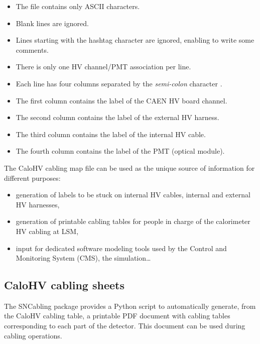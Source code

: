 \begin{itemize}
\item The file contains only ASCII characters.
\item Blank lines are ignored.
\item Lines starting with the hashtag character \fbox{\texttt{\#}} are
  ignored, enabling to write some comments.
\item There is only one HV channel/PMT association per line.
\item Each  line has  four columns  separated by  the \emph{semi-colon}
  character \fbox{\texttt{;}}.
\item The first column contains the label of the CAEN HV board channel.
\item The second column contains the label of the external HV harness.
\item The third column contains the label of the internal HV cable.
\item The fourth column contains the label of the PMT (optical module).
\end{itemize}

\par\noindent The  CaloHV cabling map file  can be used as  the unique
source of information for different purposes:
\begin{itemize}
\item generation of labels to be stuck on internal HV cables, internal
  and external HV harnesses,
\item generation of  printable cabling tables for people  in charge of
  the calorimeter HV cabling at LSM,
\item input for dedicated software  modeling tools used by the Control
  and Monitoring System (CMS), the simulation\dots
\end{itemize}


\subsection{CaloHV cabling sheets}


The  SNCabling  package  provides  a  Python  script  to  automatically
generate, from the CaloHV cabling table, a printable PDF document with
cabling  tables  corresponding to  each  part  of the  detector.  This
document can be used during cabling operations.



